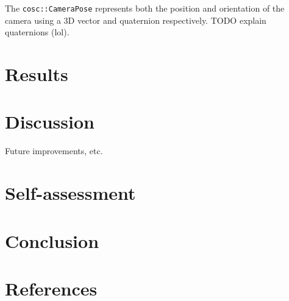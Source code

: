 \documentclass[11pt]{article}
\begin{document}
The \verb|cosc::CameraPose| represents both the position and orientation of the camera using a 3D vector and
quaternion respectively. TODO explain quaternions (lol).

\section{Results}

\section{Discussion}
Future improvements, etc.

\section{Self-assessment}

\section{Conclusion}

\section{References}
\printbibliography[heading=none]
\end{document}
